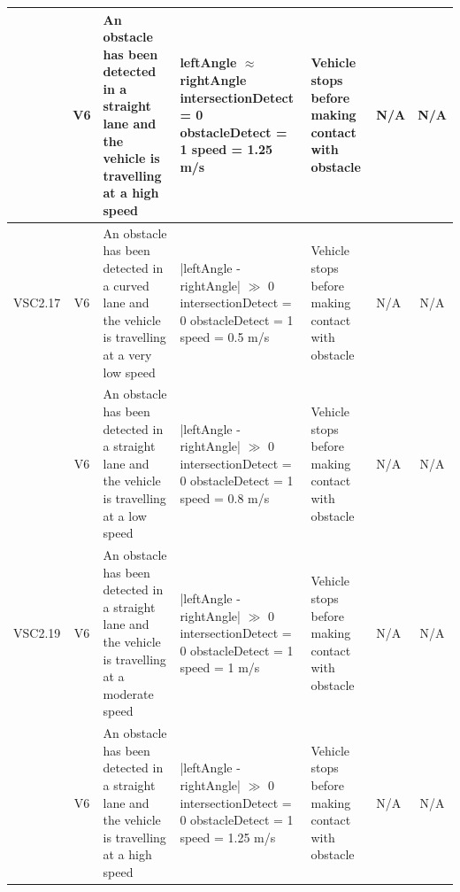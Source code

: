 \documentclass [10pt]{article}
\begin{document}
\begin{longtable}{ | p{ } | p{ } |  p{ } |  p{ } | p{ } | p{ } |  p{ } |}
    \rowcolor{tableCell}\multicolumn{1}{|c|}{VSC2.16} 
    & \multicolumn{1}{c|}{V6}
    & An obstacle has been detected in a straight lane and the vehicle is travelling at a high speed
    & leftAngle $\approx$ rightAngle \newline
    intersectionDetect = 0 \newline
    obstacleDetect = 1 \newline
    speed = 1.25 m/s
    & Vehicle stops before making contact with obstacle
    & N/A
    & \multicolumn{1}{c|}{N/A}\\\hline
    
    \multicolumn{1}{|c|}{VSC2.17} 
    & \multicolumn{1}{c|}{V6}
    & An obstacle has been detected in a curved lane and the vehicle is travelling at a very low speed
    & |leftAngle - rightAngle| $\gg$ 0 \newline
    intersectionDetect = 0 \newline
    obstacleDetect = 1 \newline
    speed = 0.5 m/s
    & Vehicle stops before making contact with obstacle
    & N/A
    & \multicolumn{1}{c|}{N/A}\\ \hline
    
    \rowcolor{tableCell}\multicolumn{1}{|c|}{VSC2.18} 
    & \multicolumn{1}{c|}{V6}
    & An obstacle has been detected in a straight lane and the vehicle is travelling at a low speed
    & |leftAngle - rightAngle| $\gg$ 0 \newline
    intersectionDetect = 0 \newline
    obstacleDetect = 1 \newline
    speed = 0.8 m/s
    & Vehicle stops before making contact with obstacle
    & N/A
    & \multicolumn{1}{c|}{N/A}\\ \hline
    
    \multicolumn{1}{|c|}{VSC2.19} 
    & \multicolumn{1}{c|}{V6}
    & An obstacle has been detected in a straight lane and the vehicle is travelling at a moderate speed
    & |leftAngle - rightAngle| $\gg$ 0 \newline
    intersectionDetect = 0 \newline
    obstacleDetect = 1 \newline
    speed = 1 m/s
    & Vehicle stops before making contact with obstacle
    & N/A
    & \multicolumn{1}{c|}{N/A}\\\hline
    
    \rowcolor{tableCell}\multicolumn{1}{|c|}{VSC2.20} 
    & \multicolumn{1}{c|}{V6}
    & An obstacle has been detected in a straight lane and the vehicle is travelling at a high speed
    & |leftAngle - rightAngle| $\gg$ 0 \newline
    intersectionDetect = 0 \newline
    obstacleDetect = 1 \newline
    speed = 1.25 m/s
    & Vehicle stops before making contact with obstacle
    & N/A
    & \multicolumn{1}{c|}{N/A}\\\hline
     

\end{longtable}
\end{document}
